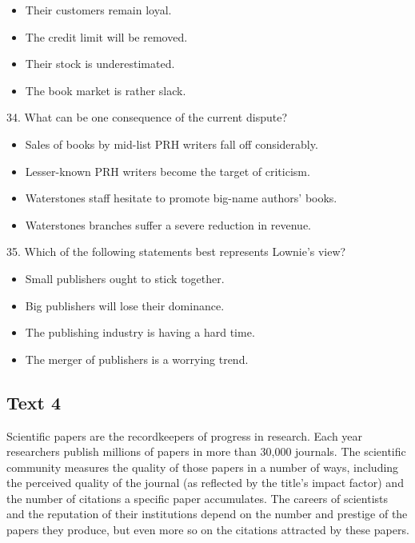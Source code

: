 \documentclass[UTF8,11pt]{ctexart}
\begin{document}
\begin{itemize}[leftmargin=2em,itemsep=.2em,topsep=.4em]\item[A.] Their customers remain loyal.
\item[B.] The credit limit will be removed.
\item[C.] Their stock is underestimated.
\item[D.] The book market is rather slack.
\end{itemize}

34. What can be one consequence of the current dispute?


\begin{itemize}[leftmargin=2em,itemsep=.2em,topsep=.4em]\item[A.] Sales of books by mid-list PRH writers fall off considerably.
\item[B.] Lesser-known PRH writers become the target of criticism.
\item[C.] Waterstones staff hesitate to promote big-name authors’ books.
\item[D.] Waterstones branches suffer a severe reduction in revenue.
\end{itemize}

35. Which of the following statements best represents Lownie’s view?


\begin{itemize}[leftmargin=2em,itemsep=.2em,topsep=.4em]\item[A.] Small publishers ought to stick together.
\item[B.] Big publishers will lose their dominance.
\item[C.] The publishing industry is having a hard time.
\item[D.] The merger of publishers is a worrying trend.
\end{itemize}

\subsection*{\textbf{Text 4}}


Scientific papers are the recordkeepers of progress in research. Each year researchers publish millions of papers in more than 30,000 journals. The scientific community measures the quality of those papers in a number of ways, including the perceived quality of the journal (as reflected by the title’s impact factor) and the number of citations a specific paper accumulates. The careers of scientists and the reputation of their institutions depend on the number and prestige of the papers they produce, but even more so on the citations attracted by these papers.
\end{document}
